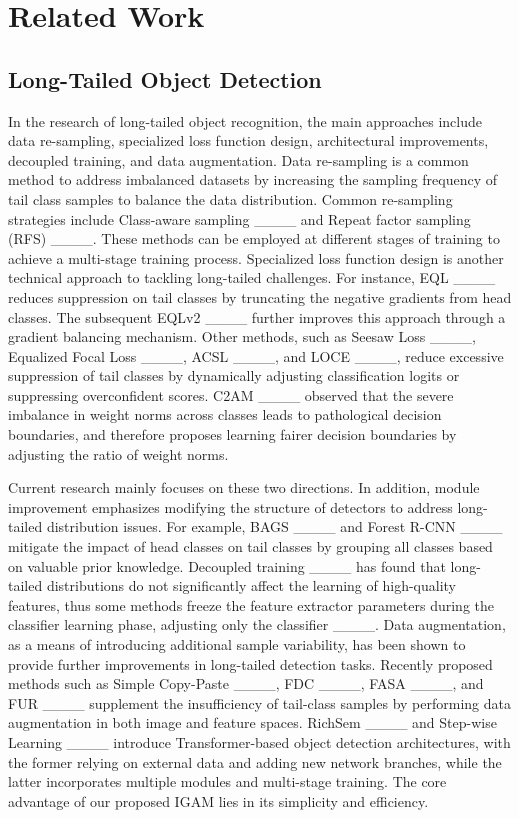 \section{Related Work}
\vspace{-3mm}

\subsection{Long-Tailed Object Detection}
\label{sec2.1}
\vspace{-3mm}

In the research of long-tailed object recognition, the main approaches include data re-sampling, specialized loss function design, architectural improvements, decoupled training, and data augmentation.
Data re-sampling is a common method to address imbalanced datasets by increasing the sampling frequency of tail class samples to balance the data distribution. Common re-sampling strategies include Class-aware sampling ____ and Repeat factor sampling (RFS) ____. These methods can be employed at different stages of training to achieve a multi-stage training process. Specialized loss function design is another technical approach to tackling long-tailed challenges. For instance, EQL ____ reduces suppression on tail classes by truncating the negative gradients from head classes. The subsequent EQLv2 ____ further improves this approach through a gradient balancing mechanism. Other methods, such as Seesaw Loss ____, Equalized Focal Loss ____, ACSL ____, and LOCE ____, reduce excessive suppression of tail classes by dynamically adjusting classification logits or suppressing overconfident scores. C2AM ____ observed that the severe imbalance in weight norms across classes leads to pathological decision boundaries, and therefore proposes learning fairer decision boundaries by adjusting the ratio of weight norms. 

Current research mainly focuses on these two directions. In addition, module improvement emphasizes modifying the structure of detectors to address long-tailed distribution issues. For example, BAGS ____ and Forest R-CNN ____ mitigate the impact of head classes on tail classes by grouping all classes based on valuable prior knowledge. Decoupled training ____ has found that long-tailed distributions do not significantly affect the learning of high-quality features, thus some methods freeze the feature extractor parameters during the classifier learning phase, adjusting only the classifier ____. Data augmentation, as a means of introducing additional sample variability, has been shown to provide further improvements in long-tailed detection tasks. Recently proposed methods such as Simple Copy-Paste ____, FDC ____, FASA ____, and FUR ____ supplement the insufficiency of tail-class samples by performing data augmentation in both image and feature spaces.
RichSem ____ and Step-wise Learning ____ introduce Transformer-based object detection architectures, with the former relying on external data and adding new network branches, while the latter incorporates multiple modules and multi-stage training. The core advantage of our proposed IGAM lies in its simplicity and efficiency.

